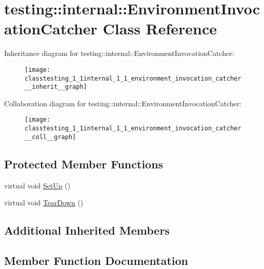 \hypertarget{classtesting_1_1internal_1_1_environment_invocation_catcher}{}\section{testing\+:\+:internal\+:\+:Environment\+Invocation\+Catcher Class Reference}
\label{classtesting_1_1internal_1_1_environment_invocation_catcher}


Inheritance diagram for testing\+:\+:internal\+:\+:Environment\+Invocation\+Catcher\+:
\nopagebreak
\begin{figure}[H]
\begin{center}
\leavevmode
\texttt{[image: classtesting\_1\_1internal\_1\_1\_environment\_invocation\_catcher\_\_inherit\_\_graph]}
\end{center}
\end{figure}


Collaboration diagram for testing\+:\+:internal\+:\+:Environment\+Invocation\+Catcher\+:
\nopagebreak
\begin{figure}[H]
\begin{center}
\leavevmode
\texttt{[image: classtesting\_1\_1internal\_1\_1\_environment\_invocation\_catcher\_\_coll\_\_graph]}
\end{center}
\end{figure}
\subsection*{Protected Member Functions}
\begin{DoxyCompactItemize}
\item 
virtual void \hyperlink{classtesting_1_1internal_1_1_environment_invocation_catcher_a325365b0ecfa71a4a767d7a1817c9663}{Set\+Up} ()
\item 
virtual void \hyperlink{classtesting_1_1internal_1_1_environment_invocation_catcher_afc89ee0a8e32e6746a89fcc1682f62e9}{Tear\+Down} ()
\end{DoxyCompactItemize}
\subsection*{Additional Inherited Members}


\subsection{Member Function Documentation}
